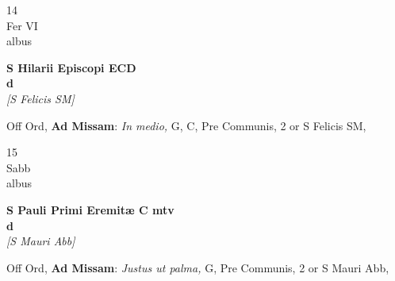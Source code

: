 \documentclass[10pt, openany]{book}
\begin{document}
        \begin{center}
            \begin{minipage}{3.5in}
                \vspace{2em}
                \begin{minipage}{0.5in}
                    {\Huge 14} \\
                    {\normalsize Fer VI} \\
                    {\normalsize albus}
                \end{minipage}
                \begin{minipage}{3.0in}
                    \textbf{ \large S Hilarii Episcopi ECD \\
                    \textnormal{\normalsize d}} \\ \textit{[S Felicis SM]} \\ 
                \end{minipage}
                \begin{justify}Off Ord, \textbf{Ad Missam}: \textit{In medio,} G, C, Pre Communis, 2 or S Felicis SM,  
                \end{justify}
            \end{minipage}
        \end{center}
    
        \begin{center}
            \begin{minipage}{3.5in}
                \vspace{2em}
                \begin{minipage}{0.5in}
                    {\Huge 15} \\
                    {\normalsize Sabb} \\
                    {\normalsize albus}
                \end{minipage}
                \begin{minipage}{3.0in}
                    \textbf{ \large S Pauli Primi Eremitæ C mtv \\
                    \textnormal{\normalsize d}} \\ \textit{[S Mauri Abb]} \\ 
                \end{minipage}
                \begin{justify}Off Ord, \textbf{Ad Missam}: \textit{Justus ut palma,} G, Pre Communis, 2 or S Mauri Abb,  
                \end{justify}
            \end{minipage}
        \end{center}
    
\end{document}
